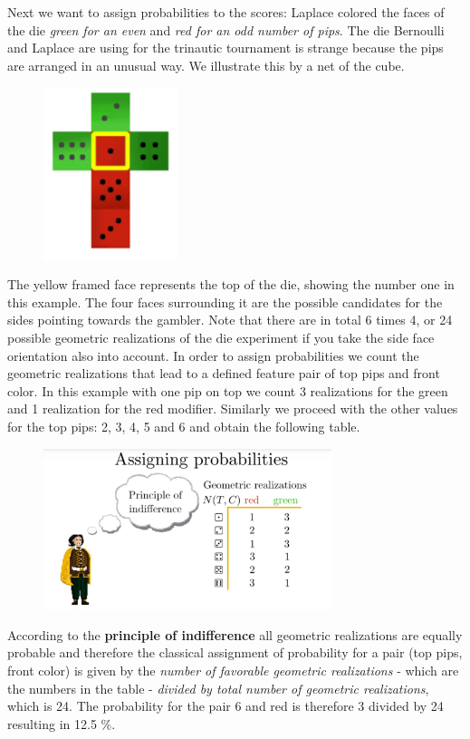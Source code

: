 \documentclass[12pt, a4paper]{scrartcl}
\begin{document}
Next we want to assign probabilities to the scores:
Laplace colored the faces of the die \textit{green for an even} and \textit{red for an odd number of pips}. 
The die Bernoulli and Laplace are using for the trinautic tournament is strange because the pips are arranged in an unusual way. We illustrate this by a net of the cube. 
\begin{figure}[H]
	\centering
	\includegraphics[width=0.35\textwidth]{3_3.png}
\end{figure}
The yellow framed face represents the top of the die, showing the number one in this example.
The four faces surrounding it are the possible candidates for the sides pointing towards the gambler. Note that there are in total 6 times 4, or 24 possible geometric realizations of the die experiment if you take the side face orientation also into account.
In order to assign probabilities we count the geometric realizations that lead to a defined feature pair of top pips and front color.
In this example with one pip on top we count 3 realizations for the green and 1 realization for the red modifier.
Similarly we proceed with the other values for the top pips: 2, 3, 4, 5 and 6 and obtain the following table. %
\begin{figure}[H]
	\centering
	\includegraphics[width=0.75\textwidth]{3_4.png}
\end{figure}
According to the \textbf{principle of indifference} all geometric realizations are equally probable and therefore the classical assignment of probability for a pair (top pips, front color) is given by the \textit{number of favorable geometric realizations} - which are the numbers in the table - \textit{divided by total number of geometric realizations}, which is 24. 
The probability for the pair 6 and red is therefore 3 divided by 24 resulting in 12.5 \%.  \\
\end{document}

